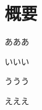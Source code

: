 ﻿\chapter*{概要}
\label{abst}
\def\thepage{}
\thispagestyle{empty}

あああ\vspace{12pt}

いいい\vspace{12pt}

ううう\vspace{12pt}

えええ
\thispagestyle{empty}

\newpage

